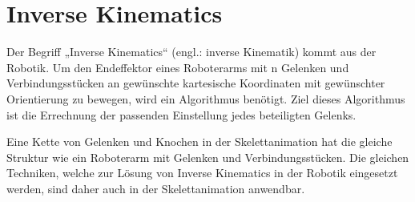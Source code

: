 \section{Inverse Kinematics}
%
Der Begriff „Inverse Kinematics“ (engl.: inverse Kinematik) kommt aus der Robotik. Um den Endeffektor eines Roboterarms mit n Gelenken und Verbindungsstücken an gewünschte kartesische Koordinaten mit gewünschter Orientierung zu bewegen, wird ein Algorithmus benötigt. Ziel dieses Algorithmus ist die Errechnung der passenden Einstellung jedes beteiligten Gelenks.\newline\newline

Eine Kette von Gelenken und Knochen in der Skelettanimation hat die gleiche Struktur wie ein Roboterarm mit Gelenken und Verbindungsstücken. Die gleichen Techniken, welche zur Lösung von Inverse Kinematics in der Robotik eingesetzt werden, sind daher auch in der Skelettanimation anwendbar.
%
